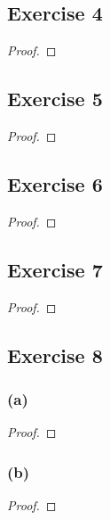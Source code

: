 \documentclass[14pt]{extarticle}
\begin{document}
\subsection{Exercise 4}

\begin{proof}

\end{proof}

\subsection{Exercise 5}

\begin{proof}

\end{proof}

\subsection{Exercise 6}

\begin{proof}

\end{proof}

\subsection{Exercise 7}

\begin{proof}

\end{proof}

\subsection{Exercise 8}

\subsubsection{(a)}

\begin{proof}

\end{proof}

\subsubsection{(b)}

\begin{proof}

\end{proof}
\end{document}
